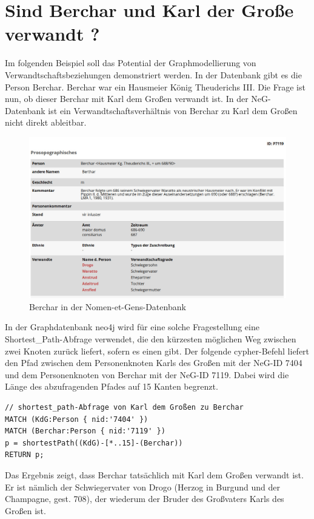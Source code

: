\documentclass[ngerman,]{scrreprt}
\begin{document}
\section{Sind Berchar und Karl der Große verwandt ?}\label{sind-berchar-und-karl-der-grouxdfe-verwandt}

Im folgenden Beispiel soll das Potential der Graphmodellierung von Verwandtschaftsbeziehungen demonstriert werden. In der Datenbank gibt es die Person Berchar. Berchar war ein Hausmeier König Theuderichs III. Die Frage ist nun, ob dieser Berchar mit Karl dem Großen verwandt ist. In der NeG-Datenbank ist ein Verwandtschaftsverhältnis von Berchar zu Karl dem Großen nicht direkt ableitbar.

\begin{figure}
\centering
\includegraphics{Bilder/NeG/040-Berchar-DB-Eintrag.jpg}
\caption{Berchar in der Nomen-et-Gens-Datenbank}
\end{figure}

In der Graphdatenbank neo4j wird für eine solche Fragestellung eine Shortest\_Path-Abfrage verwendet, die den kürzesten möglichen Weg zwischen zwei Knoten zurück liefert, sofern es einen gibt. Der folgende cypher-Befehl liefert den Pfad zwischen dem Personenknoten Karls des Großen mit der NeG-ID 7404 und dem Personenknoten von Berchar mit der NeG-ID 7119. Dabei wird die Länge des abzufragenden Pfades auf 15 Kanten begrenzt.

\begin{verbatim}
// shortest_path-Abfrage von Karl dem Großen zu Berchar
MATCH (KdG:Person { nid:'7404' })
MATCH (Berchar:Person { nid:'7119' })
p = shortestPath((KdG)-[*..15]-(Berchar))
RETURN p;
\end{verbatim}

Das Ergebnis zeigt, dass Berchar tatsächlich mit Karl dem Großen verwandt ist. Er ist nämlich der Schwiegervater von Drogo (Herzog in Burgund und der Champagne, gest. 708), der wiederum der Bruder des Großvaters Karls des Großen ist.
\end{document}

